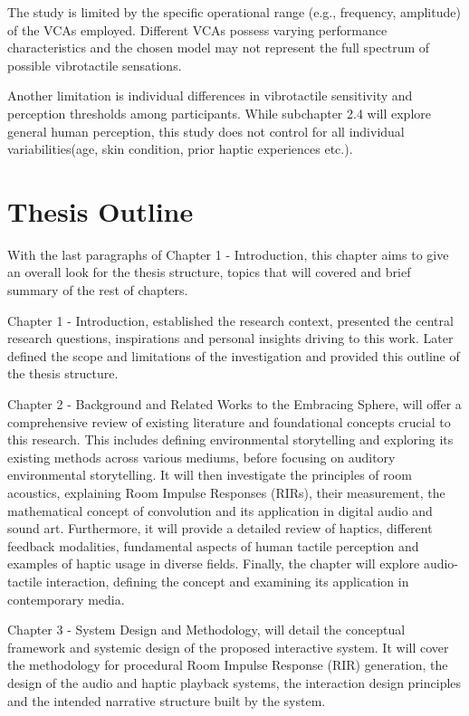     The study is limited by the specific operational range (e.g., frequency, amplitude) of the VCAs employed. Different VCAs possess varying performance characteristics and the chosen model may not represent the full spectrum of possible vibrotactile sensations.\par

    Another limitation is individual differences in vibrotactile sensitivity and perception thresholds among participants. While subchapter 2.4 will explore general human perception, this study does not control for all individual variabilities(age, skin condition, prior haptic experiences etc.).\par
    \section{Thesis Outline}
    With the last paragraphs of Chapter 1 - Introduction, this chapter aims to give an overall look for the thesis structure, topics that will covered and brief summary of the rest of chapters.\par

    Chapter 1 - Introduction, established the research context, presented the central research questions, inspirations and personal insights driving to this work. Later defined the scope and limitations of the investigation and provided this outline of the thesis structure.\par

    Chapter 2 - Background and Related Works to the Embracing Sphere, will offer a comprehensive review of existing literature and foundational concepts crucial to this research. This includes defining environmental storytelling and exploring its existing methods across various mediums, before focusing on auditory environmental storytelling. It will then investigate the principles of room acoustics, explaining Room Impulse Responses (RIRs), their measurement, the mathematical concept of convolution and its application in digital audio and sound art. Furthermore, it will provide a detailed review of haptics, different feedback modalities, fundamental aspects of human tactile perception and examples of haptic usage in diverse fields. Finally, the chapter will explore audio-tactile interaction, defining the concept and examining its application in contemporary media.\par

    Chapter 3 - System Design and Methodology, will detail the conceptual framework and systemic design of the proposed interactive system. It will cover the methodology for procedural Room Impulse Response (RIR) generation, the design of the audio and haptic playback systems, the interaction design principles and the intended narrative structure built by the system.\par

